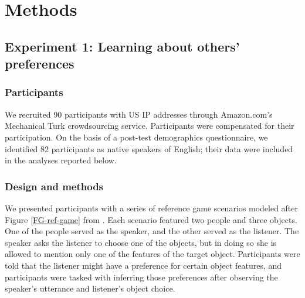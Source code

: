 \documentclass[10pt,a4paper]{article}
\begin{document}

\section*{Methods}


\subsection*{Experiment 1: Learning about others' preferences}

\subsubsection*{Participants}

We recruited 90 participants with US IP addresses through Amazon.com's Mechanical Turk crowdsourcing service. Participants were compensated for their participation. On the basis of a post-test demographics questionnaire, we identified 82 participants as native speakers of English; their data were included in the analyses reported below.

\subsubsection*{Design and methods}

We presented participants with a series of reference game scenarios modeled after Figure \ref{FG-ref-game} from . Each scenario featured two people and three objects. One of the people served as the speaker, and the other served as the listener. The speaker asks the listener to choose one of the objects, but in doing so she is allowed to mention only one of the features of the target object. Participants were told that the listener might have a preference for certain object features, and participants were tasked with inferring those preferences after observing the speaker's utterance and listener's object choice.
\end{document}
